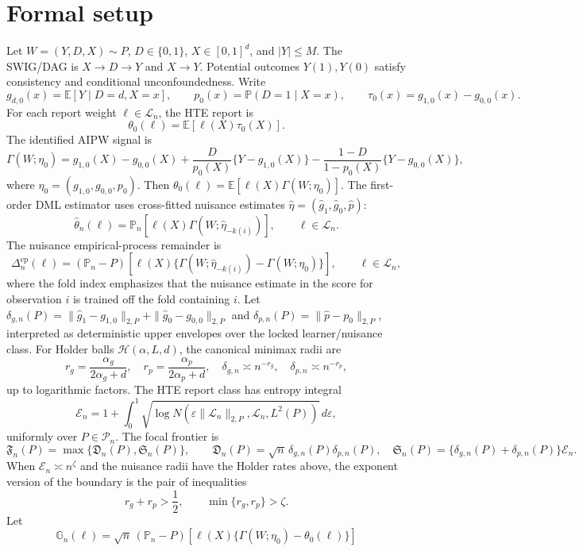 \documentclass[11pt]{article}
\newcommand{\E}{\mathbb{E}}
\renewcommand{\Pr}{\mathbb{P}}
\theoremstyle{definition}
\theoremstyle{plain}
\theoremstyle{remark}
\begin{document}
\section{Formal setup}
Let \(W=(Y,D,X)\sim P\), \(D\in\{0,1\}\), \(X\in[0,1]^d\), and
\(|Y|\le M\).  The SWIG/DAG is \(X\to D\to Y\) and \(X\to Y\).  Potential
outcomes \(Y(1),Y(0)\) satisfy consistency and conditional unconfoundedness.
Write
\[
g_{d,0}(x)=\E[Y\mid D=d,X=x],\qquad p_0(x)=\Pr(D=1\mid X=x),\qquad
\tau_0(x)=g_{1,0}(x)-g_{0,0}(x).
\]
For each report weight \(\ell\in\mathcal{L}_n\), the HTE report is
\[
\theta_0(\ell)=\E[\ell(X)\tau_0(X)].
\]
The identified AIPW signal is
\[
\Gamma(W;\eta_0)=g_{1,0}(X)-g_{0,0}(X)
+\frac{D}{p_0(X)}\{Y-g_{1,0}(X)\}
-\frac{1-D}{1-p_0(X)}\{Y-g_{0,0}(X)\},
\]
where \(\eta_0=(g_{1,0},g_{0,0},p_0)\).  Then
\(\theta_0(\ell)=\E[\ell(X)\Gamma(W;\eta_0)]\).  The first-order DML estimator
uses cross-fitted nuisance estimates \(\hat\eta=(\hat g_1,\hat g_0,\hat p)\):
\[
\hat\theta_n(\ell)=\mathbb{P}_n[\ell(X)\Gamma(W;\hat\eta_{-k(i)})],
\qquad \ell\in\mathcal{L}_n.
\]
The nuisance empirical-process remainder is
\[
\Delta^{\mathrm{ep}}_n(\ell)
=
(\mathbb{P}_n-P)\!\left[
\ell(X)\{\Gamma(W;\hat\eta_{-k(i)})-\Gamma(W;\eta_0)\}
\right],
\qquad \ell\in\mathcal{L}_n,
\]
where the fold index emphasizes that the nuisance estimate in the score for
observation \(i\) is trained off the fold containing \(i\).
Let \(\delta_{g,n}(P)=\|\hat g_1-g_{1,0}\|_{2,P}+\|\hat g_0-g_{0,0}\|_{2,P}\)
and \(\delta_{p,n}(P)=\|\hat p-p_0\|_{2,P}\), interpreted as deterministic
upper envelopes over the locked learner/nuisance class.  For Holder balls
\(\mathcal{H}(\alpha,L,d)\), the canonical minimax radii are
\[
r_g=\frac{\alpha_g}{2\alpha_g+d},\quad
r_p=\frac{\alpha_p}{2\alpha_p+d},\quad
\delta_{g,n}\asymp n^{-r_g},\quad \delta_{p,n}\asymp n^{-r_p},
\]
up to logarithmic factors.  The HTE report class has entropy integral
\[
\mathcal{E}_n=
1+\int_0^1\sqrt{\log N(\varepsilon\|\mathcal{L}_n\|_{2,P},
\mathcal{L}_n,L^2(P))}\,d\varepsilon,
\]
uniformly over \(P\in\mathcal{P}_n\).  The focal frontier is
\[
\mathfrak{F}_n(P)=\max\{\mathfrak{D}_n(P),\mathfrak{S}_n(P)\},\qquad
\mathfrak{D}_n(P)=\sqrt n\,\delta_{g,n}(P)\delta_{p,n}(P),\quad
\mathfrak{S}_n(P)=\{\delta_{g,n}(P)+\delta_{p,n}(P)\}\mathcal{E}_n.
\]
When \(\mathcal{E}_n\asymp n^\zeta\) and the nuisance radii have the Holder
rates above, the exponent version of the boundary is the pair of inequalities
\[
r_g+r_p>\frac12,\qquad \min\{r_g,r_p\}>\zeta.
\]
Let
\[
\mathbb{G}_n(\ell)=\sqrt n\,(\mathbb{P}_n-P)[\ell(X)\{\Gamma(W;\eta_0)-\theta_0(\ell)\}]
\]
\end{document}
